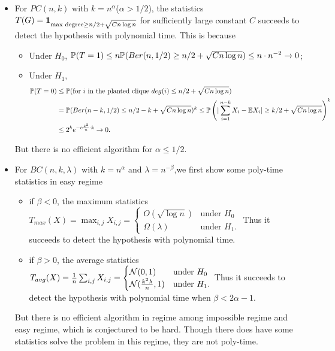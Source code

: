 \begin{itemize}
    \item For $PC(n,k)$ with $k=n^{\alpha}$($\alpha>1/2$), the statistics $T(G)=\mathbf{1}_{\text{max degree}\ge n/2+\sqrt{Cn\log n}}$ for sufficiently large constant $C$ succeeds to detect the hypothesis with polynomial time.
    This is because
    \begin{itemize}
        \item Under $H_0$, $\mathbb{P}(T=1)\le n\mathbb{P}(Ber(n,1/2)\ge n/2+\sqrt{Cn\log n})\le n\cdot n^{-2}\rightarrow 0$;
        \item Under $H_1$, 
        \begin{align*}
            \mathbb{P}(T=0)&\le \mathbb{P}(\text{for }i\text{ in the planted clique }deg(i)\le n/2+\sqrt{Cn\log n})\\
            &=\mathbb{P}(Ber(n-k,1/2)\le n/2-k+\sqrt{Cn\log n})^k\le \mathbb{P}\left(|\sum_{i=1}^{n-k}X_i-\mathbb{E}X_i|\ge k/2+\sqrt{Cn\log n}\right)^k\\
            &\le 2^ke^{-c\frac{k^2}{n}\cdot k} \rightarrow 0.
        \end{align*}
    \end{itemize}
    
    But there is no efficient algorithm for $\alpha\le 1/2$.

    \item For $BC(n,k,\lambda)$\cite{ma2015computational} with $k=n^\alpha$ and $\lambda=n^{-\beta}$,we first show some poly-time statistics in easy regime
    \begin{itemize}
        \item if $\beta< 0$, the maximum statistics $T_{max}(X)=\max_{i,j}X_{i,j}=\begin{cases}
            O(\sqrt{\log n}) & \text{under } H_0 \\
            \Omega(\lambda) & \text{under } H_1.
        \end{cases}$ 
        Thus it succeeds to detect the hypothesis with polynomial time.
        \item if $\beta> 0$, the average statistics $T_{avg}(X)=\frac{1}{n}\sum_{i,j}X_{i,j}=\begin{cases}
            \mathcal{N}(0,1) & \text{under } H_0 \\
            \mathcal{N}(\frac{k^2\lambda}{n},1) & \text{under } H_1.
        \end{cases}$
        Thus it succeeds to detect the hypothesis with polynomial time when $\beta<2\alpha - 1$.
    \end{itemize}
    But there is no efficient algorithm in regime among impossible regime and easy regime, which is conjectured to be hard.
    Though there does have some statistics solve the problem in this regime, they are not poly-time. 
    

\end{itemize}
